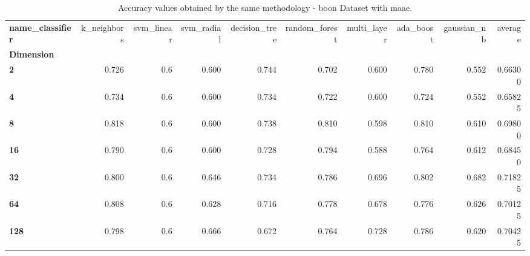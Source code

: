 \begin{table}
\centering
\caption{Accuracy values obtained by the same methodology - boon Dataset with maae.}
\label{accuracy_boon_maae-reproduction}
\begin{tabular}{lrrrrrrrrr}
\toprule
\textbf{name\_classifier} &  k\_neighbors &  svm\_linear &  svm\_radial &  decision\_tree &  random\_forest &  multi\_layer &  ada\_boost &  gaussian\_nb &  average \\
\textbf{Dimension} &              &             &             &                &                &              &            &              &          \\
\midrule
\textbf{2        } &        0.726 &         0.6 &       0.600 &          0.744 &          0.702 &        0.600 &      0.780 &        0.552 &  0.66300 \\
\textbf{4        } &        0.734 &         0.6 &       0.600 &          0.734 &          0.722 &        0.600 &      0.724 &        0.552 &  0.65825 \\
\textbf{8        } &        0.818 &         0.6 &       0.600 &          0.738 &          0.810 &        0.598 &      0.810 &        0.610 &  0.69800 \\
\textbf{16       } &        0.790 &         0.6 &       0.600 &          0.728 &          0.794 &        0.588 &      0.764 &        0.612 &  0.68450 \\
\textbf{32       } &        0.800 &         0.6 &       0.646 &          0.734 &          0.786 &        0.696 &      0.802 &        0.682 &  0.71825 \\
\textbf{64       } &        0.808 &         0.6 &       0.628 &          0.716 &          0.778 &        0.678 &      0.776 &        0.626 &  0.70125 \\
\textbf{128      } &        0.798 &         0.6 &       0.666 &          0.672 &          0.764 &        0.728 &      0.786 &        0.620 &  0.70425 \\
\bottomrule
\end{tabular}
\end{table}
